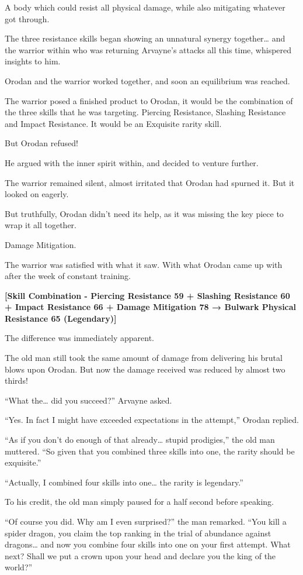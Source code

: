\documentclass[a4paper,10pt]{book}
\begin{document}
A body which could resist all physical damage, while also mitigating whatever got through.\par
The three resistance skills began showing an unnatural synergy together… and the warrior within who was returning Arvayne’s attacks all this time, whispered insights to him.\par
Orodan and the warrior worked together, and soon an equilibrium was reached.\par
The warrior posed a finished product to Orodan, it would be the combination of the three skills that he was targeting. Piercing Resistance, Slashing Resistance and Impact Resistance. It would be an Exquisite rarity skill.\par
But Orodan refused!\par
He argued with the inner spirit within, and decided to venture further.\par
The warrior remained silent, almost irritated that Orodan had spurned it. But it looked on eagerly.\par
But truthfully, Orodan didn’t need its help, as it was missing the key piece to wrap it all together.\par
Damage Mitigation.\par
The warrior was satisfied with what it saw. With what Orodan came up with after the week of constant training.\par
\textbf{[Skill Combination - Piercing Resistance 59 + Slashing Resistance 60 + Impact Resistance 66 + Damage Mitigation 78 → Bulwark Physical Resistance 65 (Legendary)]}\par
The difference was immediately apparent.\par
The old man still took the same amount of damage from delivering his brutal blows upon Orodan. But now the damage received was reduced by almost two thirds!\par
“What the… did you succeed?” Arvayne asked.\par
“Yes. In fact I might have exceeded expectations in the attempt,” Orodan replied.\par
“As if you don’t do enough of that already… stupid prodigies,” the old man muttered. “So given that you combined three skills into one, the rarity should be exquisite.”\par
“Actually, I combined four skills into one… the rarity is legendary.”\par
To his credit, the old man simply paused for a half second before speaking.\par
“Of course you did. Why am I even surprised?” the man remarked. “You kill a spider dragon, you claim the top ranking in the trial of abundance against dragons… and now you combine four skills into one on your first attempt. What next? Shall we put a crown upon your head and declare you the king of the world?”\par
\end{document}
